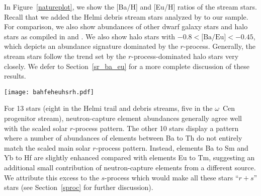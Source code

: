 \documentclass[twocolumn]{aastex63}
\begin{document}
In Figure~\ref{natureplot}, we show the [Ba/H] and [Eu/H] ratios of the stream stars.
Recall that we added the Helmi debris stream stars analyzed by \citet{Roederer10} to our sample. For comparison, we also show abundances of other dwarf galaxy stars and halo stars as compiled in \citet{frebel10} and \citet{abohalima18}. We also show halo stars with $-0.8<\mbox{[Ba/Eu]}<-0.45$, which depicts an abundance signature dominated by the $r$-process. Generally, the stream stars follow the trend set by the $r$-process-dominated halo stars very closely. We defer to Section~\ref{sr_ba_eu} for a more complete discussion of these results.

\begin{figure*}[!ht]
 \begin{center}
  \texttt{[image: bahfeheuhsrh.pdf]} 
 \end{center}
\end{figure*}


  

For 13 stars (eight in the Helmi trail and debris streams, five in the $\omega$~Cen progenitor stream), neutron-capture element abundances generally agree well with the scaled solar $r$-process pattern. The other 10 stars display a pattern where a number of abundances of elements between Ba to Th do not entirely match the scaled main solar $r$-process pattern. Instead, elements Ba to Sm and Yb to Hf are slightly enhanced compared with elements Eu to Tm, suggesting an additional small contribution of neutron-capture elements from a different source. We attribute this excess to the $s$-process  which would make all these stars ``$r+s$'' stars (see Section~\ref{sproc} for further discussion). 
 
\end{document}
